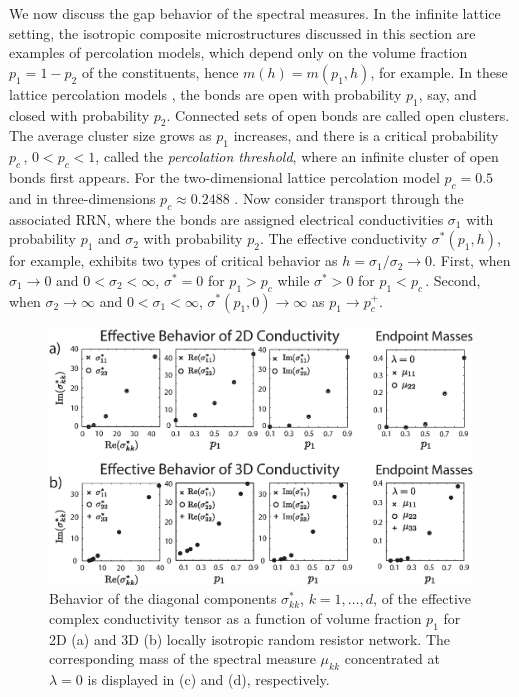 \documentclass{cmslatex}
\newcommand{\I}{\mathrm{i}}
\begin{document}
We now discuss the gap behavior of the spectral measures. In the
infinite lattice setting, the isotropic composite 
microstructures discussed in this section are examples of percolation
models, which depend only on the volume fraction $p_1=1-p_2$ of the
constituents, hence $m(h)=m(p_1,h)$, for example. In these lattice
percolation models \cite{Stauffer-92,Torquato:RHM-02}, the bonds are 
open with probability $p_1$, say, and closed with probability
$p_2$. Connected sets of open bonds are called open clusters. The
average cluster size grows as $p_1$ increases, and there is a critical
probability $p_c\,$, $0<p_c<1$, called the \emph{percolation
  threshold}, where an infinite cluster of open bonds first
appears. For the two-dimensional lattice percolation model $p_c=0.5$
and in three-dimensions $p_c\approx0.2488$ 
\cite{Stauffer-92,Torquato:RHM-02}. Now consider transport through the
associated RRN, where the bonds are assigned electrical conductivities
$\sigma_1$ with probability $p_1$ and $\sigma_2$ with probability $p_2$. The
effective conductivity $\sigma^*(p_1,h)$, for example, exhibits two types
of critical behavior as $h=\sigma_1/\sigma_2\to0$. First, when $\sigma_1\to0$ and
$0<\sigma_2<\infty$, $\sigma^*=0$ for $p_1>p_c$ while $\sigma^*>0$ for $p_1<p_c\,$.
Second, when $\sigma_2\to\infty$ and $0<\sigma_1<\infty$, $\sigma^*(p_1,0) \to \infty$ as $p_1\to p_c^+$.


%
\begin{figure}[t]
  \centerline{\includegraphics[scale=0.68]{Effective_Parameter_Behavior_4_75GHz.eps}} 
\caption{Behavior of the diagonal components $\sigma^*_{kk}$, $k=1,\ldots,d$, of
  the effective complex conductivity tensor as a function of volume
  fraction $p_1$ for 2D (a) and 3D (b) locally isotropic random
  resistor network. The corresponding mass of the spectral
  measure $\mu_{kk}$ concentrated at $\lambda=0$ is displayed in (c) and (d),
  respectively.   
        }
\label{fig:Effective_Parameter_Behavior}
\end{figure}
%
\end{document}
